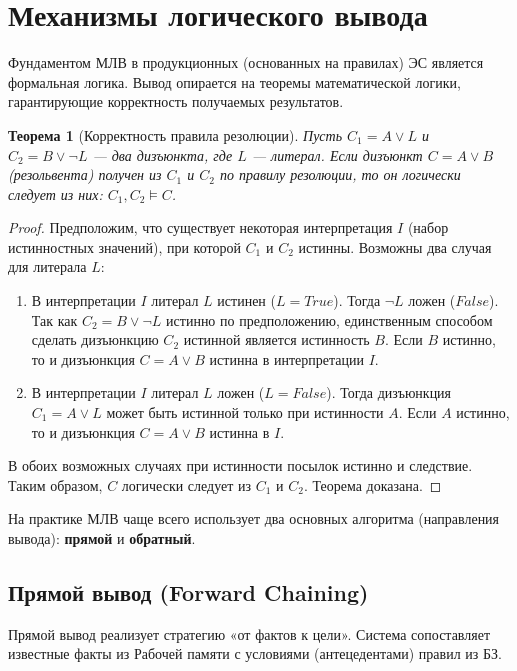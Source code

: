 \documentclass[12pt,a4paper]{article}
\newtheorem{theorem}{Теорема}
\begin{document}
\section{Механизмы логического вывода}

Фундаментом МЛВ в продукционных (основанных на правилах) ЭС является формальная логика. Вывод опирается на теоремы математической логики, гарантирующие корректность получаемых результатов.

\begin{theorem}[Корректность правила резолюции]
Пусть $C_1 = A \vee L$ и $C_2 = B \vee \neg L$ --- два дизъюнкта, где $L$ --- литерал. Если дизъюнкт $C = A \vee B$ (резольвента) получен из $C_1$ и $C_2$ по правилу резолюции, то он логически следует из них: $C_1, C_2 \models C$.
\end{theorem}

\begin{proof}
Предположим, что существует некоторая интерпретация $I$ (набор истинностных значений), при которой $C_1$ и $C_2$ истинны. Возможны два случая для литерала $L$:
\begin{enumerate}
    \item В интерпретации $I$ литерал $L$ истинен ($L = True$). Тогда $\neg L$ ложен ($False$). Так как $C_2 = B \vee \neg L$ истинно по предположению, единственным способом сделать дизъюнкцию $C_2$ истинной является истинность $B$. Если $B$ истинно, то и дизъюнкция $C = A \vee B$ истинна в интерпретации $I$.
    \item В интерпретации $I$ литерал $L$ ложен ($L = False$). Тогда дизъюнкция $C_1 = A \vee L$ может быть истинной только при истинности $A$. Если $A$ истинно, то и дизъюнкция $C = A \vee B$ истинна в $I$.
\end{enumerate}
В обоих возможных случаях при истинности посылок истинно и следствие. Таким образом, $C$ логически следует из $C_1$ и $C_2$. Теорема доказана.
\end{proof}

На практике МЛВ чаще всего использует два основных алгоритма (направления вывода): \textbf{прямой} и \textbf{обратный}.

\subsection{Прямой вывод (Forward Chaining)}

Прямой вывод реализует стратегию «от фактов к цели». Система сопоставляет известные факты из Рабочей памяти с условиями (антецедентами) правил из БЗ.
\end{document}
